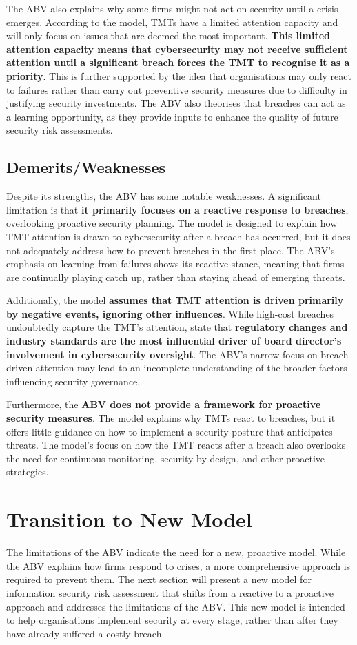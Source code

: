     The ABV also explains why some firms might not act on security until a crisis emerges. According to the model, TMTs have a limited attention capacity and will only focus on issues that are deemed the most important. \textbf{This limited attention capacity means that cybersecurity may not receive sufficient attention until a significant breach forces the TMT to recognise it as a priority}. This is further supported by the idea that organisations may only react to failures rather than carry out preventive security measures due to difficulty in justifying security investments. The ABV also theorises that breaches can act as a learning opportunity, as they provide inputs to enhance the quality of future security risk assessments.

    \subsection{Demerits/Weaknesses}
    Despite its strengths, the ABV has some notable weaknesses. A significant limitation is that \textbf{it primarily focuses on a reactive response to breaches}, overlooking proactive security planning. The model is designed to explain how TMT attention is drawn to cybersecurity after a breach has occurred, but it does not adequately address how to prevent breaches in the first place. The ABV's emphasis on learning from failures shows its reactive stance, meaning that firms are continually playing catch up, rather than staying ahead of emerging threats.

    Additionally, the model \textbf{assumes that TMT attention is driven primarily by negative events, ignoring other influences}. While high-cost breaches undoubtedly capture the TMT's attention, \citet{gale2022governing} state that \textbf{regulatory changes and industry standards are the most influential driver of board director's involvement in cybersecurity oversight}. The ABV's narrow focus on breach-driven attention may lead to an incomplete understanding of the broader factors influencing security governance.

    Furthermore, the \textbf{ABV does not provide a framework for proactive security measures}. The model explains why TMTs react to breaches, but it offers little guidance on how to implement a security posture that anticipates threats. The model's focus on how the TMT reacts after a breach also overlooks the need for continuous monitoring, security by design, and other proactive strategies.

\section{Transition to New Model}
The limitations of the ABV indicate the need for a new, proactive model. While the ABV explains how firms respond to crises, a more comprehensive approach is required to prevent them. The next section will present a new model for information security risk assessment that shifts from a reactive to a proactive approach and addresses the limitations of the ABV. This new model is intended to help organisations implement security at every stage, rather than after they have already suffered a costly breach.